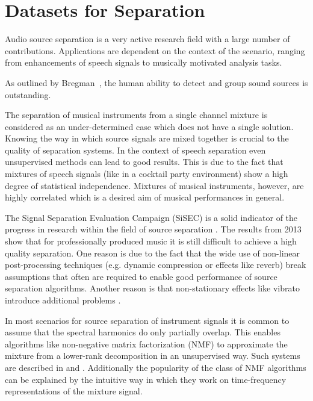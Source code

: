 \chapter{Datasets for Separation}

Audio source separation is a very active research field with a large number of contributions. Applications are dependent on the context of the scenario, ranging from enhancements of speech signals to musically motivated analysis tasks.

As outlined by Bregman~\cite{bregman94}, the human ability to detect and group sound sources is outstanding.


The separation of musical instruments from a single channel mixture is considered as an under-determined case which does not have a single solution. Knowing the way in which source signals are mixed together is crucial to the quality of separation systems. In the context of speech separation even unsupervised methods can lead to good results. This is due to the fact that mixtures of speech signals (like in a cocktail party environment) show a high degree of statistical independence. Mixtures of musical instruments, however, are highly correlated which is a desired aim of musical performances in general.

The Signal Separation Evaluation Campaign (SiSEC) is a solid indicator of the progress in research within the field of source separation \cite{vincent12}. The results from 2013 \cite{sisec13} show that for professionally produced music it is still difficult to achieve a high quality separation.
One reason is due to the fact that the wide use of non-linear post-processing techniques (e.g. dynamic compression or effects like reverb) break assumptions that often are required to enable good performance of source separation algorithms. Another reason is that non-stationary effects like vibrato introduce additional problems \cite{nakano10}.

In most scenarios for source separation of instrument signals it is common to assume that the spectral harmonics do only partially overlap. This enables algorithms like non-negative matrix factorization (NMF) to approximate the mixture from a lower-rank decomposition in an unsupervised way. Such systems are described in \cite{smaragdis03} and \cite{virtanen07}. Additionally the popularity of the class of NMF algorithms can be explained by the intuitive way in which they work on time-frequency representations of the mixture signal.

